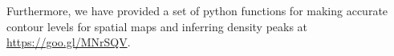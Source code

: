 Furthermore, we have provided a set of python functions for making accurate 
contour levels for spatial maps and inferring density peaks at 
\href{https://goo.gl/MNrSQV}{https://goo.gl/MNrSQV}.
% 
% 
% 
% 
% 
% 
% 
% 
% 
% 
% 
% 
% 
% 
% 
% 
